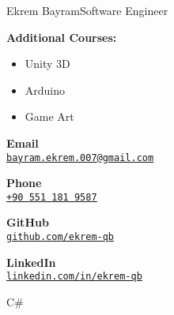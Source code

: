 \documentclass{article}
\begin{document}
\begin{cv}[avatar]{Ekrem Bayram}{Software Engineer}

    \begin{cvevent}[2021][present]
        \textbf{Additional Courses:}
        \begin{itemize}
            \item Unity 3D
            \item Arduino
            \item Game Art
        \end{itemize}
    \end{cvevent}

    \cvsidebar %



    \begin{cvitem}[Envelope][4]
        \textbf{Email}\\
        \href{mailto:bayram.ekrem.007@gmail.com}{\texttt{\uline{bayram.ekrem.007@gmail.com}}}
    \end{cvitem}

    \cvseparator[3]
    \begin{cvitem}[Phone][4]
        \textbf{Phone}\\
        \href{tel:+905511819587}{\texttt{\uline{+90 551 181 9587}}}
    \end{cvitem}

    \cvseparator[3]
    \begin{cvitem}[Github][4]
        \textbf{GitHub}\\
        \href{https://www.github.com/ekrem-qb}{\texttt{\uline{github.com/ekrem-qb}}}
    \end{cvitem}

    \cvseparator[3]
    \begin{cvitem}[Linkedin][4]
        \textbf{LinkedIn}\\
        \href{https://www.linkedin.com/in/ekrem-qb}{\texttt{\uline{linkedin.com/in/ekrem-qb}}}
    \end{cvitem}



    \begin{cvitem}
        C\#
    \end{cvitem}


\end{cv}
\end{document}

